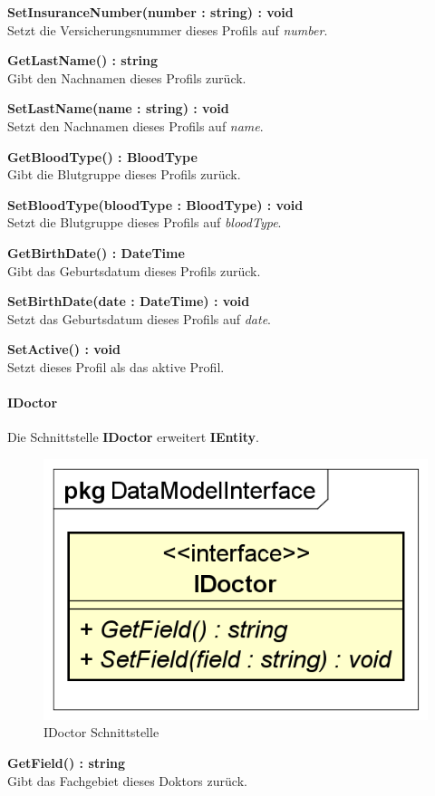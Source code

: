 \documentclass[a4paper]{scrreprt}
\begin{document}
\textbf{SetInsuranceNumber(number : string) : void}\\
Setzt die Versicherungsnummer dieses Profils auf \textit{number}.

\textbf{GetLastName() : string}\\
Gibt den Nachnamen dieses Profils zurück.

\textbf{SetLastName(name : string) : void}\\
Setzt den Nachnamen dieses Profils auf \textit{name}.

\textbf{GetBloodType() : BloodType}\\
Gibt die Blutgruppe dieses Profils zurück.

\textbf{SetBloodType(bloodType : BloodType) : void}\\
Setzt die Blutgruppe dieses Profils auf \textit{bloodType}.

\textbf{GetBirthDate() : DateTime}\\
Gibt das Geburtsdatum dieses Profils zurück.

\textbf{SetBirthDate(date : DateTime) : void}\\
Setzt das Geburtsdatum dieses Profils auf \textit{date}.

\textbf{SetActive() : void}\\
Setzt dieses Profil als das aktive Profil.

\paragraph{IDoctor}
Die Schnittstelle \textbf{IDoctor} erweitert \textbf{IEntity}.

\begin{figure}[H]
\centering
\includegraphics[width=0.45\textheight]{graphics/Klassendiagramme/Model/IDoctor.png}
\caption{IDoctor Schnittstelle}
\end{figure}
\textbf{GetField() : string}\\
Gibt das Fachgebiet dieses Doktors zurück.
\end{document}
